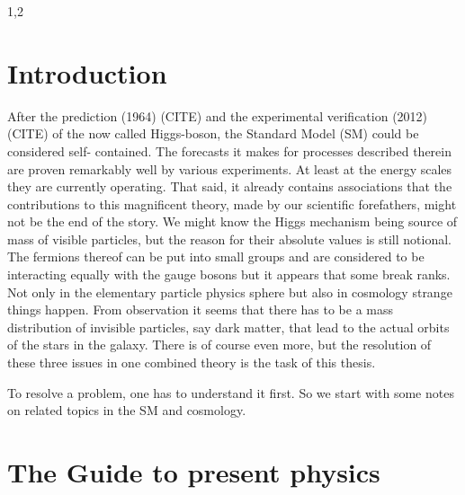 \documentclass[11pt,a4paper,twoside]{article}
\begin{document}
\begin{spacing}{1,2}

\thispagestyle{empty}
 \cleardoublepage

\setcounter{page}{1}
\pagestyle{fancy}

\section{Introduction}
After the prediction (1964) (CITE) and the experimental verification (2012) (CITE) of the
now called Higgs-boson, the Standard Model (SM) could be considered self-
contained. The forecasts it makes for processes described therein are proven
remarkably well by various experiments. At least at the energy scales they
are currently operating. That said, it already contains associations that the
contributions to this magnificent theory, made by our scientific forefathers, might not be
the end of the story. We might know the Higgs mechanism being source of mass of visible particles,
but the reason for their absolute values is still notional. The fermions thereof can be put into
small groups and are considered to be interacting equally with the gauge bosons but it appears
that some break ranks. Not only in the elementary particle physics sphere but also in cosmology
strange things happen. From observation it seems that there has to be a mass distribution of
invisible particles, say dark matter, that lead to the actual orbits of the stars in the galaxy.
There is of course even more, but the resolution of these three issues in one combined theory is
the task of this thesis.

\noindent To resolve a problem, one has to understand it first. So we start with some notes on 
related topics in the SM and cosmology.




\section{The Guide to present physics}



\end{spacing}
\end{document}
